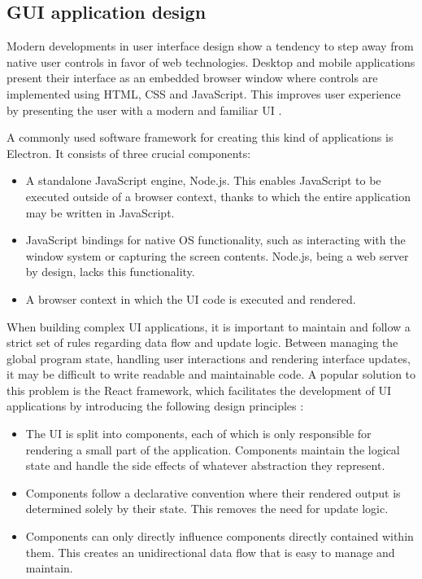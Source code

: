 \subsection{GUI application design}

Modern developments in user interface design show a tendency to step away from
native user controls in favor of web technologies. Desktop and mobile
applications present their interface as an embedded browser window where
controls are implemented using HTML, CSS and JavaScript. This improves user
experience by presenting the user with a modern and familiar UI \cite{webgui}.

A commonly used software framework for creating this kind of applications is
Electron. It consists of three crucial components:
\begin{itemize}
    \item A standalone JavaScript engine, Node.js. This enables JavaScript to
    be executed outside of a browser context, thanks to which the entire
    application may be written in JavaScript.
    \item JavaScript bindings for native OS functionality, such as interacting
    with the window system or capturing the screen contents. Node.js, being a
    web server by design, lacks this functionality.
    \item A browser context in which the UI code is executed and rendered.
\end{itemize}

When building complex UI applications, it is important to maintain and follow
a strict set of rules regarding data flow and update logic. Between managing
the global program state, handling user interactions and rendering interface
updates, it may be difficult to write readable and maintainable code. A popular
solution to this problem is the React framework, which facilitates the
development of UI applications by introducing the following design principles
\cite{react}:
\begin{itemize}
    \item The UI is split into components, each of which is only responsible
    for rendering a small part of the application. Components maintain the
    logical state and handle the side effects of whatever abstraction they
    represent.
    \item Components follow a declarative convention where their rendered
    output is determined solely by their state. This removes the need for
    update logic.
    \item Components can only directly influence components directly contained
    within them. This creates an unidirectional data flow that is easy to manage
    and maintain.
\end{itemize}

